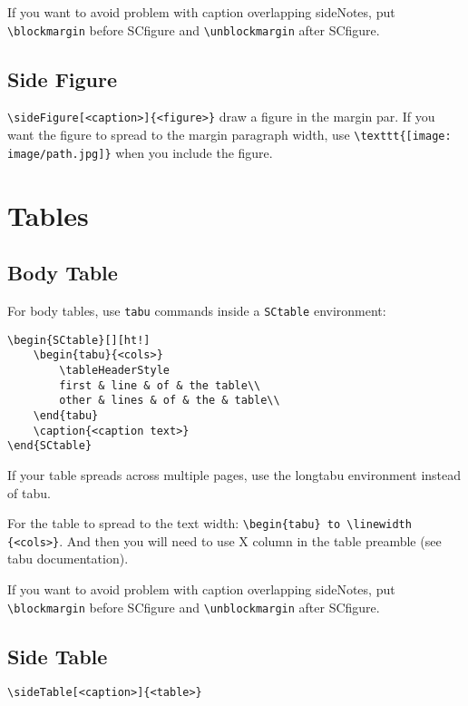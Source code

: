 \documentclass[a4paper, 11pt, oneside, fleqn]{article}
\begin{document}
	If you want to avoid problem with caption overlapping sideNotes, put \lstinline[breaklines]|\blockmargin| before SCfigure and \lstinline[breaklines]|\unblockmargin| after SCfigure.
	
	\subsection{Side Figure}
	\lstinline[breaklines]|\sideFigure[<caption>]{<figure>}| draw a figure in the margin par. If you want the figure to spread to the margin paragraph width, use \lstinline[breaklines]|\texttt{[image: image/path.jpg]}| when you include the figure.
	
	
	\section{Tables}
	\subsection{Body Table}
	For body tables, use \lstinline[breaklines]|tabu| commands inside a \lstinline[breaklines]|SCtable| environment:
	\begin{lstlisting}
\begin{SCtable}[][ht!]
	\begin{tabu}{<cols>}
		\tableHeaderStyle
		first & line & of & the table\\
		other & lines & of & the & table\\
	\end{tabu}
	\caption{<caption text>}
\end{SCtable}
	\end{lstlisting}
	If your table spreads across multiple pages, use the longtabu environment instead of tabu.
	
	For the table to spread to the text width: \lstinline[breaklines]|\begin{tabu} to \linewidth {<cols>}|. And then you will need to use X column in the table preamble (see tabu documentation).
	
	If you want to avoid problem with caption overlapping sideNotes, put \lstinline[breaklines]|\blockmargin| before SCfigure and \lstinline[breaklines]|\unblockmargin| after SCfigure.
	
	\subsection{Side Table}
	\lstinline[breaklines]|\sideTable[<caption>]{<table>}|
	
\end{document}
